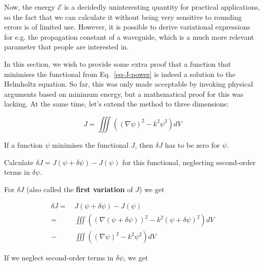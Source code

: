 Now, the energy $\mathcal{E}$ is a decidedly uninteresting quantity for practical applications, so the fact that we can calculate it without being very sensitive to rounding errors is of limited use. However, it is possible to derive variational expressions for e.g. the propagation constant of a waveguide, which is a much more relevant parameter that people are interested in.

\pagebreak



In this section, we wish to provide some extra proof that a function that minimises the functional from Eq.~\ref{eq-J-power} is indeed a solution to the Helmholtz equation. So far, this was only made acceptable by invoking physical arguments based on minimum energy, but a mathematical proof for this was lacking. At the same time, let's extend the method to three dimensions:

\begin{equation}
J = \iiint \left((\nabla \psi)^2 - k^2 \psi^2 \right) dV \label{eq-variational1}
\end{equation} 

\noindent{}If a function $\psi$ minimises the functional $J$, then $\delta J$ has to be zero for $\psi$.

\begin{cue}
Calculate $\delta J = J(\psi + \delta \psi) - J(\psi)$ for this functional, neglecting second-order terms in $\delta \psi$.
\end{cue}

\noindent{}For $\delta J$ (also called the \textbf{first variation} of $J$) we get

\begin{align}
\delta J =& \, J(\psi + \delta \psi) - J(\psi) \nonumber \\
  =& \, \iiint \left( (\nabla (\psi + \delta \psi))^2 - k^2 (\psi + \delta \psi)^2 \right) dV \nonumber   \\
  -& \, \iiint \left((\nabla \psi)^2 - k^2 \psi^2 \right) dV
\end{align} 

If we neglect second-order terms in $\delta \psi$, we get

